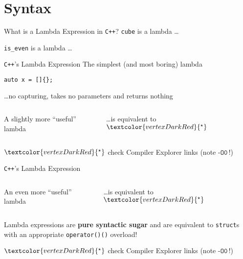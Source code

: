 \section{Syntax}

\begin{frame}[fragile]{What is a Lambda Expression in \texttt{C++}?}
    \texttt{cube} is a lambda \ldots

    \texttt{is\_even} is a lambda \ldots
\end{frame}

\begin{frame}[fragile]{\texttt{C++}'s Lambda Expression}
    The simplest (and most boring) lambda
    \begin{lstlisting}
auto x = []{};
    \end{lstlisting}
    \hfill \ldots no capturing, takes no parameters and returns nothing

    \vspace{5mm}

    \begin{columns}[t]
        \begin{column}{.45\textwidth}
            A slightly more \enquote{useful} lambda
        \end{column}
        \begin{column}{.46\textwidth}
            \ldots is equivalent to$\textcolor{vertexDarkRed}{{}^\star}$ 
        \end{column}
    \end{columns}
    
    \vspace{5mm}

    \footnotesize $\textcolor{vertexDarkRed}{{}^\star}$ check Compiler Explorer links (note $\texttt{-O0}$\,!)
\end{frame}

\begin{frame}[fragile]{\texttt{C++}'s Lambda Expression}
    \begin{columns}[t]
        \begin{column}{.45\textwidth}
            An even more \enquote{useful} lambda
        \end{column}
        \begin{column}{.46\textwidth}
            \ldots is equivalent to$\textcolor{vertexDarkRed}{{}^\star}$ 
        \end{column}
    \end{columns}

    Lambda expressions are \textbf{pure syntactic sugar} and are equivalent to \texttt{struct}s with an appropriate \texttt{operator()()} overload!
    
    \vspace{5mm}

    \footnotesize $\textcolor{vertexDarkRed}{{}^\star}$ check Compiler Explorer links (note $\texttt{-O0}$\,!)
\end{frame}

